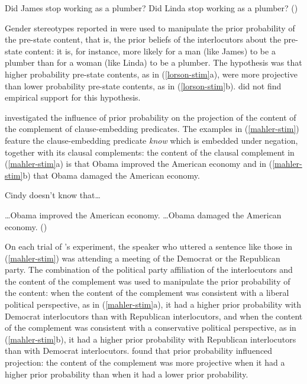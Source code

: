 \documentclass[11pt,fleqn]{article}
\newcommand{\6}{\mbox{$[\hspace*{-.6mm}[$}}
\newcommand{\9}{\mbox{$]\hspace*{-.6mm}]$}}
\newcommand{\citepos}[1]{\citeauthor{#1}'s \citeyear{#1}}
\begin{document}
\begin{exe}
\ex\label{lorson-stim} 
\begin{xlist}
\ex Did James stop working as a plumber?
\ex Did Linda stop working as a plumber? \hfill (\citealt[38]{lorson2018})
\end{xlist}
\end{exe}
Gender stereotypes reported in \citealt{boyce-etal2018} were used to manipulate the prior probability of the pre-state content, that is, the prior beliefs of the interlocutors about the pre-state content: it is, for instance, more likely for a man (like James) to be a plumber than for a woman (like Linda) to be a plumber. The hypothesis was that higher probability pre-state contents, as in (\ref{lorson-stim}a), were more projective than lower probability pre-state contents, as in (\ref{lorson-stim}b). \citet{lorson2018} did not find empirical support for this hypothesis.

\citet{mahler2020} investigated the influence of prior probability on the projection of the content of the complement of clause-embedding predicates. The examples in (\ref{mahler-stim}) feature the clause-embedding predicate {\em know} which is embedded under negation, together with its clausal complements: the content of the clausal complement in (\ref{mahler-stim}a) is that Obama improved the American economy and in (\ref{mahler-stim}b) that Obama damaged the American economy.

\begin{exe}
\ex\label{mahler-stim} Cindy doesn't know that\ldots
\begin{xlist}
\ex \ldots Obama improved the American economy.
\ex \ldots Obama damaged the American economy. \hfill (\citealt[779]{mahler2020})
\end{xlist}
\end{exe}
On each trial of \citepos{mahler2020} experiment, the speaker who uttered a sentence like those in (\ref{mahler-stim}) was attending a meeting of the Democrat or the Republican party. The combination of the political party affiliation of the interlocutors and the content of the complement was used to manipulate the prior probability of the content: when the content of the complement was consistent with a liberal political perspective, as in (\ref{mahler-stim}a), it had a higher prior probability with Democrat interlocutors than with Republican interlocutors, and when the content of the complement was consistent with a conservative political perspective, as in (\ref{mahler-stim}b), it had a higher prior probability with Republican interlocutors than with Democrat interlocutors. \citet{mahler2020} found that prior probability influenced projection: the content of the complement was more projective when it had a higher prior probability than when it had a lower prior probability. 
\end{document}

